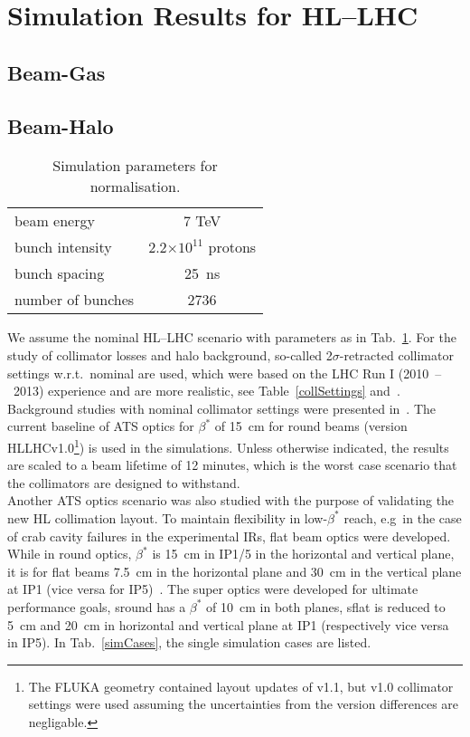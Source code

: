 \section{Simulation Results for HL--LHC}

\subsection{Beam-Gas}
\subsection{Beam-Halo }
\begin{table}%
   \centering
   \caption{Simulation parameters for normalisation.}
   \begin{tabular}{l|c}
       \hline
       beam energy & 7 TeV \\
       bunch intensity & 2.2$\times 10^{11}$ protons\\
       bunch spacing & 25~ns \\
       number of bunches & 2736 \\
       \hline
   \end{tabular}
   \label{hlscenario}
\end{table}


We assume the nominal HL--LHC scenario with parameters as in Tab.~\ref{hlscenario}. For the study of collimator losses and halo background, so-called 2$\sigma$-retracted collimator settings w.r.t.~nominal are used, which were based on the LHC Run I (2010~--~2013) experience and are more realistic, see Table~\ref{collSettings} and~\cite{collSettRef}. Background studies with nominal collimator settings were presented in~\cite{lastyear}. The current baseline of ATS optics for $\beta^{*}$ of 15~cm for round beams (version HLLHCv1.0\footnote{The FLUKA geometry contained layout updates of v1.1, but v1.0 collimator settings were used assuming the uncertainties from the version differences are negligable.}) is used in the simulations.  Unless otherwise indicated, the results are scaled to a beam lifetime of 12 minutes, which is the worst case scenario that the collimators are 
designed to withstand.\\
Another ATS optics scenario was also studied with the purpose of validating the new HL collimation layout. To maintain flexibility in low-$\beta^*$ reach, e.g~in the case of crab cavity failures in the experimental IRs, flat beam optics were developed. While in round optics, $\beta^*$ is 15~cm in IP1/5 in the horizontal and vertical plane, it is for flat beams 7.5~cm in the horizontal plane and 30~cm in the vertical plane at IP1 (vice versa for IP5)~\cite{opticsWebRef}. The super optics were developed for ultimate performance goals, sround has a $\beta^*$ of 10~cm in both planes, sflat is reduced to 5~cm and 20~cm in horizontal and vertical plane at IP1 (respectively vice versa in IP5). In Tab.~\ref{simCases}, the single simulation cases are listed.


